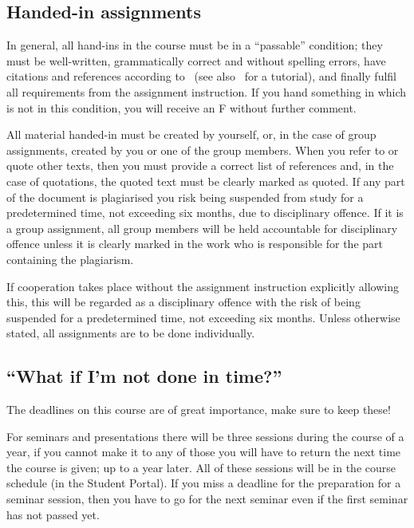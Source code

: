 \subsection{Handed-in assignments}

In general, all hand-ins in the course must be in a \enquote{passable} 
condition; \ie they must be well-written, grammatically correct and without 
spelling errors, have citations and references according to~\cite{IEEEcitation} 
(see also~\cite{PurdueCitation} for a tutorial), and finally fulfil all 
requirements from the assignment instruction.
If you hand something in which is not in this condition, you will receive an 
F without further comment.

All material handed-in must be created by yourself, or, in the case of group 
assignments, created by you or one of the group members.
When you refer to or quote other texts, then you must provide a correct list of 
references and, in the case of quotations, the quoted text must be clearly 
marked as quoted.
If any part of the document is plagiarised you risk being suspended from study 
for a predetermined time, not exceeding six months, due to disciplinary 
offence.
If it is a group assignment, all group members will be held accountable for 
disciplinary offence unless it is clearly marked in the work who is responsible 
for the part containing the plagiarism.

If cooperation takes place without the assignment instruction explicitly 
allowing this, this will be regarded as a disciplinary offence with the risk of
being suspended for a predetermined time, not exceeding six months.
Unless otherwise stated, all assignments are to be done individually.

\subsection{\enquote{What if I'm not done in time?}}%
\label{sec:late}

The deadlines on this course are of great importance, make sure to keep these!

For seminars and presentations there will be three sessions during the course 
of a year, if you cannot make it to any of those you will have to return the 
next time the course is given; \ie up to a year later.
All of these sessions will be in the course schedule (in the Student Portal).
If you miss a deadline for the preparation for a seminar session, then you have 
to go for the next seminar even if the first seminar has not passed yet.

